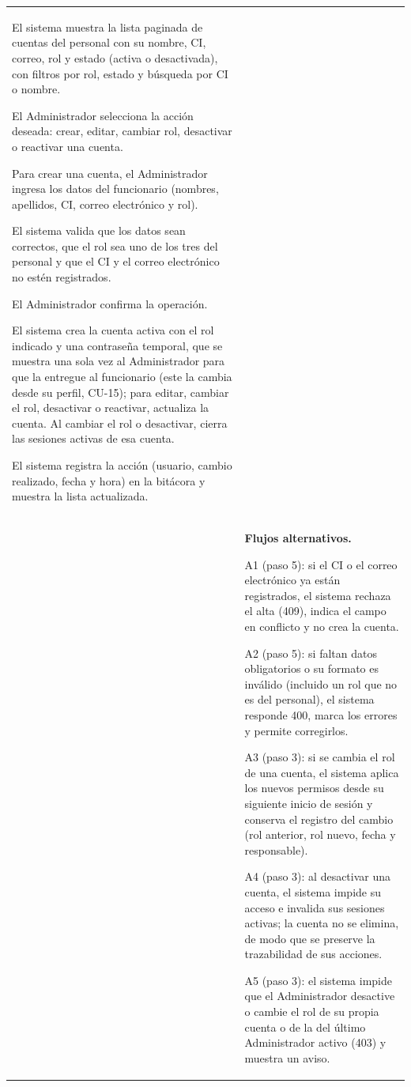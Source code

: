 \begin{longtable}{>{\raggedright\arraybackslash}p{2.9cm} >{\raggedright\arraybackslash}p{12.6cm}}
\begin{cupasos}
    \item El sistema muestra la lista paginada de cuentas del personal con su nombre, CI, correo, rol y estado (activa o desactivada), con filtros por rol, estado y búsqueda por CI o nombre.
    \item El Administrador selecciona la acción deseada: crear, editar, cambiar rol, desactivar o reactivar una cuenta.
    \item Para crear una cuenta, el Administrador ingresa los datos del funcionario (nombres, apellidos, CI, correo electrónico y rol).
    \item El sistema valida que los datos sean correctos, que el rol sea uno de los tres del personal y que el CI y el correo electrónico no estén registrados.
    \item El Administrador confirma la operación.
    \item El sistema crea la cuenta activa con el rol indicado y una contraseña temporal, que se muestra una sola vez al Administrador para que la entregue al funcionario (este la cambia desde su perfil, CU-15); para editar, cambiar el rol, desactivar o reactivar, actualiza la cuenta. Al cambiar el rol o desactivar, cierra las sesiones activas de esa cuenta.
    \item El sistema registra la acción (usuario, cambio realizado, fecha y hora) en la bitácora y muestra la lista actualizada.
\end{cupasos} \\
 & \textbf{Flujos alternativos.}
\begin{cuvin}
    \item A1 (paso 5): si el CI o el correo electrónico ya están registrados, el sistema rechaza el alta (409), indica el campo en conflicto y no crea la cuenta.
    \item A2 (paso 5): si faltan datos obligatorios o su formato es inválido (incluido un rol que no es del personal), el sistema responde 400, marca los errores y permite corregirlos.
    \item A3 (paso 3): si se cambia el rol de una cuenta, el sistema aplica los nuevos permisos desde su siguiente inicio de sesión y conserva el registro del cambio (rol anterior, rol nuevo, fecha y responsable).
    \item A4 (paso 3): al desactivar una cuenta, el sistema impide su acceso e invalida sus sesiones activas; la cuenta no se elimina, de modo que se preserve la trazabilidad de sus acciones.
    \item A5 (paso 3): el sistema impide que el Administrador desactive o cambie el rol de su propia cuenta o de la del último Administrador activo (403) y muestra un aviso.

\end{cuvin}
\end{longtable}
